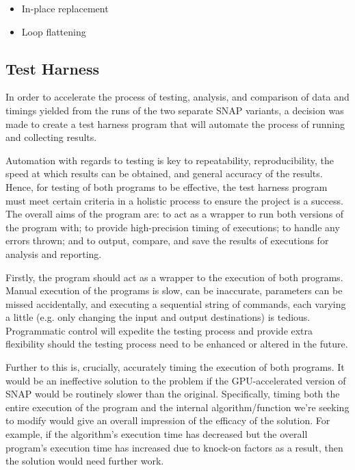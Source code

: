 \documentclass[conference]{IEEEtran}
\begin{document}
\begin{itemize}
    \item In-place replacement
    \item Loop flattening
\end{itemize}

\subsection{Test Harness}

In order to accelerate the process of testing, analysis, and comparison of data and timings yielded from the runs of the two separate SNAP variants, a decision was made to create a test harness program that will automate the process of running and collecting results.

Automation with regards to testing is key to repeatability, reproducibility, the speed at which results can be obtained, and general accuracy of the results. Hence, for testing of both programs to be effective, the test harness program must meet certain criteria in a holistic process to ensure the project is a success. The overall aims of the program are: to act as a wrapper to run both versions of the program with; to provide high-precision timing of executions; to handle any errors thrown; and to output, compare, and save the results of executions for analysis and reporting.

Firstly, the program should act as a wrapper to the execution of both programs. Manual execution of the programs is slow, can be inaccurate, parameters can be missed accidentally, and executing a sequential string of commands, each varying a little (e.g. only changing the input and output destinations) is tedious. Programmatic control will expedite the testing process and provide extra flexibility should the testing process need to be enhanced or altered in the future.

Further to this is, crucially, accurately timing the execution of both programs. It would be an ineffective solution to the problem if the GPU-accelerated version of SNAP would be routinely slower than the original. Specifically, timing both the entire execution of the program and the internal algorithm/function we're seeking to modify would give an overall impression of the efficacy of the solution. For example, if the algorithm's execution time has decreased but the overall program's execution time has increased due to knock-on factors as a result, then the solution would need further work.
\end{document}
